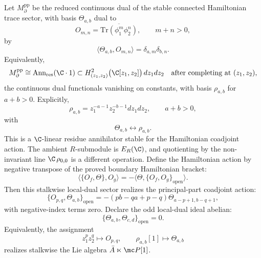 \documentclass[11pt]{memoir}
\begin{document}
\begin{constr}\label{constr:boundary-local-dual-principal-parts}
  Let $M_{\partial}^{\mathrm{pp}}$ be the reduced continuous dual of the stable
  connected Hamiltonian trace sector, with basis $\Theta_{a,b}$ dual to
  $$O_{m,n}=\overline{\mathrm{Tr}(\phi_1^m\phi_2^n)},\qquad m+n>0,$$
  by
  $$\langle\Theta_{a,b},O_{m,n}\rangle=\delta_{a,m}\delta_{b,n}.$$
  Equivalently,
  $$M_{\partial}^{\mathrm{pp}}\cong
    \operatorname{Ann}_{\mathrm{res}}(\C\cdot1)\subset
    H^2_{(z_1,z_2)}\bigl(\C[z_1,z_2]\bigr)\,dz_1dz_2
    \quad\text{after completing at }(z_1,z_2),$$
  the continuous dual functionals vanishing on constants, with basis
  $\rho_{a,b}$ for $a+b>0$. Explicitly,
  $$\rho_{a,b}=z_1^{-a-1}z_2^{-b-1}dz_1dz_2,\qquad a+b>0,$$
  with
  $$\Theta_{a,b}\longleftrightarrow\rho_{a,b}.$$
  This is a \(\C\)-linear residue annihilator stable for the Hamiltonian
  coadjoint action. The ambient \(R\)-submodule is \(E_R(\C)\), and
  quotienting by the non-invariant line \(\C\,\rho_{0,0}\) is a different
  operation.
  Define the Hamiltonian action by negative transpose of the proved boundary
  Hamiltonian bracket:
  $$\langle\{O_f,\Theta\},O_g\rangle
    =-\langle\Theta,\{O_f,O_g\}_{\mathrm{open}}\rangle.$$
  Then this stalkwise local-dual sector realizes the principal-part coadjoint
  action:
  $$\{O_{p,q},\Theta_{a,b}\}_{\mathrm{open}}
    =-(pb-qa+p-q)\Theta_{a-p+1,b-q+1},$$
  with negative-index terms zero. Declare the odd local-dual ideal abelian:
  $$\{\Theta_{a,b},\Theta_{c,d}\}_{\mathrm{open}}=0.$$
  Equivalently, the assignment
  $$z_1^pz_2^q\longmapsto O_{p,q},\qquad
    \rho_{a,b}[1]\longmapsto\Theta_{a,b}$$
  realizes stalkwise the Lie algebra
  $\bar A\ltimes\mc P[1]$.
\end{constr}
\end{document}

